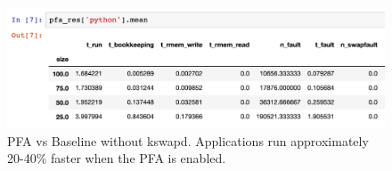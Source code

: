 	\begin{figure}[bht] \centering
    \includegraphics[width=0.8\columnwidth]{figs/perf_custom.png}
    \vspace{+1cm}
    \caption{PFA vs Baseline without kswapd. Applications run approximately
    20-40\% faster when the PFA is enabled.}
    \label{fig:pfa_perf}
  \end{figure}

%   
%
%
%
